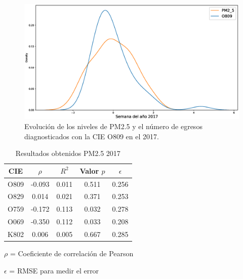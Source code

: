 \begin{figure}[h!]
\setcounter{figure}{2} %
\captionsetup{type=figure} %
\begin{center}
   \includegraphics[width=1\textwidth]{PM2_5_O809_2017.eps}
   \end{center}
    \caption[Series de tiempo 2017 PM2.5 y O809]{Evolución de los niveles de PM2.5 y el número de egresos diagnosticados con la CIE O809 en el 2017.}
    \label{serie_de_tiempo_2017_PM25}
\end{figure}

\begin{table}[hbt!]
\centering
\caption{Resultados obtenidos PM2.5 2017}
\label{tab:Resultados obtenidos PM2.5 2017}
\vspace{0.5cm}
\begin{threeparttable}
\begin{tabular}{|c|c|c|c|c|}
	\hline
	CIE & $\rho$ & $R^2$ & Valor $p$ & $\epsilon$\\
	\hline
	O809 & -0.093 & 0.011 & 0.511 & 0.256 \\
	\hline
	O829 & 0.014 & 0.021 & 0.371 & 0.253 \\
	\hline
	O759 & -0.172 & 0.113 & 0.032 & 0.278 \\
	\hline
	O069 & -0.350 & 0.112 & 0.033 & 0.208 \\
	\hline
	K802 & 0.006 & 0.005 & 0.667 & 0.285 \\
	\hline
\end{tabular}
\begin{tablenotes}
\footnotesize
\item{$\rho$ = Coeficiente de correlación de Pearson}
\item{$\epsilon$ = RMSE para medir el error}
\end{tablenotes}
\end{threeparttable}
\end{table}

